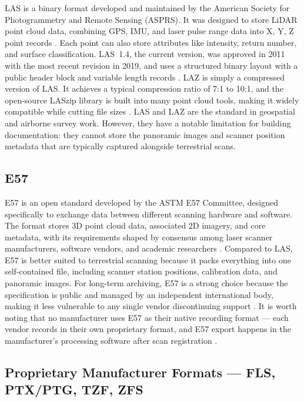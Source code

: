 \documentclass[]{report}
\begin{document}
LAS is a binary format developed and maintained by the American Society for Photogrammetry
and Remote Sensing (ASPRS). It was designed to store LiDAR point cloud data, combining GPS,
IMU, and laser pulse range data into X, Y, Z point records \cite{asprs_las_spec}. Each point can
also store attributes like intensity, return number, and surface classification. LAS~1.4, the
current version, was approved in 2011 with the most recent revision in 2019, and uses a
structured binary layout with a public header block and variable length records \cite{asprs_las_spec}.
LAZ is simply a compressed version of LAS. It achieves a typical compression ratio of 7:1 to
10:1, and the open-source LASzip library is built into many point cloud tools, making it widely
compatible while cutting file sizes \cite{cadinterop_las}. LAS and LAZ are the standard in
geospatial and airborne survey work. However, they have a notable limitation for building
documentation: they cannot store the panoramic images and scanner position metadata that are
typically captured alongside terrestrial scans.

\subsection{E57}

E57 is an open standard developed by the ASTM E57 Committee, designed specifically to
exchange data between different scanning hardware and software. The format stores 3D point
cloud data, associated 2D imagery, and core metadata, with its requirements shaped by consensus
among laser scanner manufacturers, software vendors, and academic researchers \cite{huber2011e57}.
Compared to LAS, E57 is better suited to terrestrial scanning because it packs everything into
one self-contained file, including scanner station positions, calibration data, and panoramic
images. For long-term archiving, E57 is a strong choice because the specification is public and
managed by an independent international body, making it less vulnerable to any single vendor
discontinuing support \cite{cadinterop_e57}. It is worth noting that no manufacturer uses E57 as
their native recording format --- each vendor records in their own proprietary format, and E57
export happens in the manufacturer's processing software after scan registration \cite{cadinterop_e57}.

\subsection{Proprietary Manufacturer Formats --- FLS, PTX/PTG, TZF, ZFS}
\end{document}
